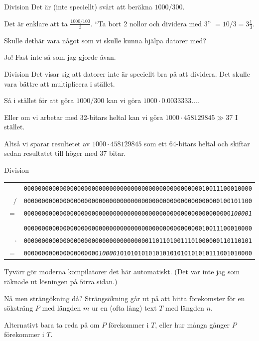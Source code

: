 \documentclass[11pt, aspectratio=169, table]{beamer}
\begin{document}
\begin{frame}{Division}
\setlength{\parskip}{\fill}
Det är (inte speciellt) svårt att beräkna $1000 / 300$.

Det är enklare att ta $\frac{1000 / 100}{3}$. ``Ta bort $2$ nollor och dividera med $3$'' $ = 10 / 3 = 3\frac{1}{3}$.

Skulle dethär vara något som vi skulle kunna hjälpa datorer med?

\pause
Jo! Fast inte så som jag gjorde åvan.
\end{frame}

\begin{frame}{Division}
\setlength{\parskip}{\fill}
Det visar sig att datorer inte är speciellt bra på att dividera. Det skulle vara bättre att multiplicera i stället.

Så i stället för att göra $1000 / 300$ kan vi göra $1000 \cdot 0.0033333\ldots$.

Eller om vi arbetar med 32-bitars heltal kan vi göra $1000 \cdot 458129845 \gg 37$ I stället.

Altså vi sparar resultetet av $1000 \cdot 458129845$ som ett 64-bitars heltal och skiftar sedan resultatet till höger med $37$ bitar.
\end{frame}

\begin{frame}[fragile]{Division}
\setlength{\parskip}{\fill}
\begin{tabular}{r c}
 & \texttt{0000000000000000000000000000000000000000000000000010011100010000} \\
$/$ & \texttt{0000000000000000000000000000000000000000000000000000000100101100} \\
\hline
$=$ & \texttt{0000000000000000000000000000000000000000000000000000000000}{\em\texttt{100001}} \\
\\
 & \texttt{0000000000000000000000000000000000000000000000000010011100010000} \\
$\cdot$ & \texttt{0000000000000000000000000000000000011011010011101000000110110101} \\
\hline
$=$ & \texttt{000000000000000000000}{\em\texttt{100001}}\texttt{0101010101010101010101010111001010000}
\end{tabular}

Tyvärr gör moderna kompilatorer det här automatiskt. (Det var inte jag som räknade ut lösningen på förra sidan.)
\end{frame}

\begin{frame}{Nå men strängökning då?}
\setlength{\parskip}{\fill}
Strängsökning går ut på att hitta förekomster för en söksträng $P$ med längden $m$ ur en (ofta lång) text $T$ med längden $n$.

Alternativt bara ta reda på om $P$ förekommer i $T$, eller hur många gånger $P$ förekommer i $T$.
\end{frame}
\end{document}
